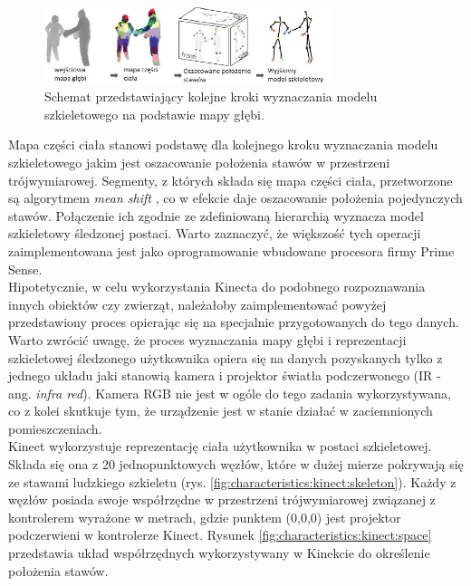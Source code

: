 	\begin{figure}[!htp]
		\centering	
		\includegraphics[width=0.75\textwidth]{images/KinectRecognitionSteps.jpg}
		\caption{Schemat przedstawiający kolejne kroki wyznaczania modelu szkieletowego na podstawie mapy głębi.}
		\label{fig:literature:kinect:classificationSteps}
	\end{figure}
		
	Mapa części ciała stanowi podstawę dla kolejnego kroku wyznaczania modelu szkieletowego jakim jest oszacowanie położenia stawów w przestrzeni trójwymiarowej. Segmenty, z których składa się mapa części ciała, przetworzone są algorytmem \emph{mean shift} \cite{Comaniciu2003}, co w efekcie daje oszacowanie położenia pojedynczych stawów. Połączenie ich zgodnie ze zdefiniowaną hierarchią wyznacza model szkieletowy śledzonej postaci. Warto zaznaczyć, że większość tych operacji zaimplementowana jest jako oprogramowanie wbudowane procesora firmy Prime Sense.\\
		
	Hipotetycznie, w celu wykorzystania Kinecta do podobnego rozpoznawania innych obiektów czy zwierząt, należałoby zaimplementować powyżej przedstawiony proces opierając się na specjalnie przygotowanych do tego danych.
	Warto zwrócić uwagę, że proces wyznaczania mapy głębi i reprezentacji szkieletowej śledzonego użytkownika opiera się na danych pozyskanych tylko z jednego układu jaki stanowią kamera i projektor światła podczerwonego (IR - ang. \textit{infra red}). Kamera RGB nie jest w ogóle do tego zadania wykorzystywana, co z kolei skutkuje tym, że urządzenie jest w stanie działać w zaciemnionych pomieszczeniach.\\
		
	Kinect wykorzystuje reprezentację ciała użytkownika w postaci szkieletowej. Składa się ona z 20 jednopunktowych węzłów, które w dużej mierze pokrywają się ze stawami ludzkiego szkieletu (rys. \ref{fig:characteristics:kinect:skeleton}). Każdy z węzłów posiada swoje współrzędne w przestrzeni trójwymiarowej związanej z kontrolerem wyrażone w metrach, gdzie punktem (0,0,0) jest projektor podczerwieni w kontrolerze Kinect. Rysunek \ref{fig:characteristics:kinect:space} przedstawia układ współrzędnych wykorzystywany w Kinekcie do określenie położenia stawów. 
		
